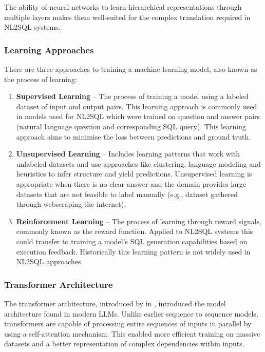 The ability of neural networks to learn hierarchical representations through
multiple layers makes them well-suited for the complex translation required in
NL2SQL systems.

\subsubsection{Learning Approaches}

There are three approaches to training a machine learning model, also known as
the process of learning:

\begin{enumerate}
    \item \textbf{Supervised Learning} – The process of training a model using
        a labeled dataset of input and output pairs. This learning approach is
        commonly used in models used for NL2SQL which were trained on question
        and answer pairs (natural language question and corresponding SQL
        query). This learning approach aims to minimise the loss between
        predictions and ground truth.
    \item \textbf{Unsupervised Learning} – Includes learning patterns that work
        with unlabeled datasets and use approaches like clustering, language
        modeling and heuristics to infer structure and yield predictions.
        Unsupervised learning is appropriate when there is no clear answer and
        the domain provides large datasets that are not feasible to label
        manually (e.g., dataset gathered through webscraping the internet).
    \item \textbf{Reinforcement Learning} – The process of learning through
        reward signals, commonly known as the reward function. Applied to
        NL2SQL systems this could transfer to training a model's SQL generation
        capabilities based on execution feedback. Historically this learning
        pattern is not widely used in NL2SQL approaches.
\end{enumerate}

\subsubsection{Transformer Architecture}

The transformer architecture, introduced by \citeauthor{Attention}
in \citeyear{Attention}, introduced the model architecture found in
modern LLMs. Unlike earlier sequence to sequence models,
transformers are capable of processing entire sequences of inputs in parallel
by using a self-attention mechanism. This enabled more efficient training on
massive datasets and a better representation of complex dependencies within
inputs.

